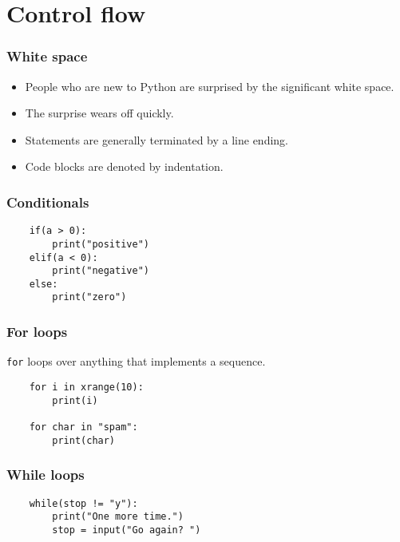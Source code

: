 \documentclass[10pt]{beamer}
\begin{document}
\section{Control flow}
\begin{frame}
	\frametitle{White space}

	\begin{itemize}
		\item People who are new to Python are surprised by the 
			significant white space.
		\item The surprise wears off quickly.
		\item Statements are generally terminated by a line ending.
		\item Code blocks are denoted by indentation.
	\end{itemize}
\end{frame}
\begin{frame}[fragile]
	\frametitle{Conditionals}

	\begin{verbatim}
    if(a > 0):
        print("positive")
    elif(a < 0):
        print("negative")
    else:
        print("zero")

	\end{verbatim}
\end{frame}
\begin{frame}[fragile]
	\frametitle{For loops}

	\texttt{for} loops over anything that implements a sequence.
	\begin{verbatim}
    for i in xrange(10):
        print(i)

    for char in "spam":
        print(char)
	\end{verbatim}
\end{frame}
\begin{frame}[fragile]
	\frametitle{While loops}

	\begin{verbatim}
    while(stop != "y"):
        print("One more time.")
        stop = input("Go again? ")

	\end{verbatim}
\end{frame}
\end{document}
